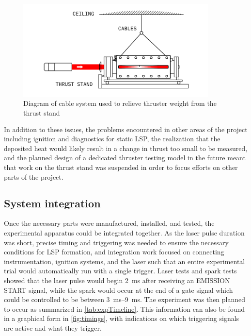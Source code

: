                 \begin{figure}[h]
                    \centering
                    \includegraphics[width=0.9\textwidth]{assets/3 design/thruster_cables}
                    \caption{Diagram of cable system used to relieve thruster weight from the thrust stand}
                    \label{fig:thruster_cables}
                \end{figure}

                In addition to these issues, the problems encountered in other areas of the project including ignition and diagnostics for static LSP, the realization that the deposited heat would likely result in a change in thrust too small to be measured, and the planned design of a dedicated thruster testing model in the future meant that work on the thrust stand was suspended in order to focus efforts on other parts of the project.

        \subsection{System integration} \label{sec:design_integration}
                Once the necessary parts were manufactured, installed, and tested, the experimental apparatus could be integrated together. As the laser pulse duration was short, precise timing and triggering was needed to ensure the necessary conditions for LSP formation, and integration work focused on connecting instrumentation, ignition systems, and the laser such that an entire experimental trial would automatically run with a single trigger. Laser tests and spark tests showed that the laser pulse would begin \qty{2}{ms} after receiving an EMISSION START signal, while the spark would occur at the end of a gate signal which could be controlled to be between \qtyrange{3}{9}{ms}. The experiment was then planned to occur as summarized in \autoref{tab:expTimeline}. This information can also be found in a graphical form in \autoref{fig:timings}, with indications on which triggering signals are active and what they trigger. 

